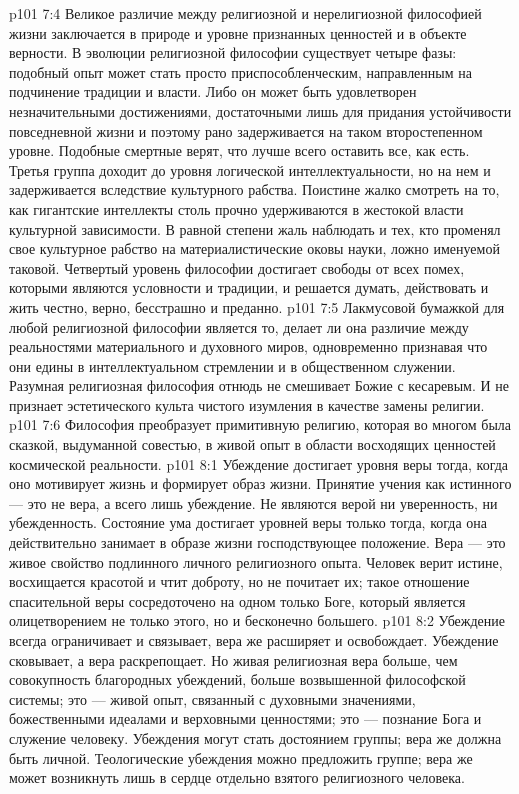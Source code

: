 \vs p101 7:4 \pc Великое различие между религиозной и нерелигиозной философией жизни заключается в природе и уровне признанных ценностей и в объекте верности. В эволюции религиозной философии существует четыре фазы: подобный опыт может стать просто приспособленческим, направленным на подчинение традиции и власти. Либо он может быть удовлетворен незначительными достижениями, достаточными лишь для придания устойчивости повседневной жизни и поэтому рано задерживается на таком второстепенном уровне. Подобные смертные верят, что лучше всего оставить все, как есть. Третья группа доходит до уровня логической интеллектуальности, но на нем и задерживается вследствие культурного рабства. Поистине жалко смотреть на то, как гигантские интеллекты столь прочно удерживаются в жестокой власти культурной зависимости. В равной степени жаль наблюдать и тех, кто променял свое культурное рабство на материалистические оковы науки, ложно именуемой таковой. Четвертый уровень философии достигает свободы от всех помех, которыми являются условности и традиции, и решается думать, действовать и жить честно, верно, бесстрашно и преданно.
\vs p101 7:5 Лакмусовой бумажкой для любой религиозной философии является то, делает ли она различие между реальностями материального и духовного миров, одновременно признавая что они едины в интеллектуальном стремлении и в общественном служении. Разумная религиозная философия отнюдь не смешивает Божие с кесаревым. И не признает эстетического культа чистого изумления в качестве замены религии.
\vs p101 7:6 Философия преобразует примитивную религию, которая во многом была сказкой, выдуманной совестью, в живой опыт в области восходящих ценностей космической реальности.
\vs p101 8:1 Убеждение достигает уровня веры тогда, когда оно мотивирует жизнь и формирует образ жизни. Принятие учения как истинного --- это не вера, а всего лишь убеждение. Не являются верой ни уверенность, ни убежденность. Состояние ума достигает уровней веры только тогда, когда она действительно занимает в образе жизни господствующее положение. Вера --- это живое свойство подлинного личного религиозного опыта. Человек верит истине, восхищается красотой и чтит доброту, но не почитает их; такое отношение спасительной веры сосредоточено на одном только Боге, который является олицетворением не только этого, но и бесконечно большего.
\vs p101 8:2 Убеждение всегда ограничивает и связывает, вера же расширяет и освобождает. Убеждение сковывает, а вера раскрепощает. Но живая религиозная вера больше, чем совокупность благородных убеждений, больше возвышенной философской системы; это --- живой опыт, связанный с духовными значениями, божественными идеалами и верховными ценностями; это --- познание Бога и служение человеку. Убеждения могут стать достоянием группы; вера же должна быть личной. Теологические убеждения можно предложить группе; вера же может возникнуть лишь в сердце отдельно взятого религиозного человека.
